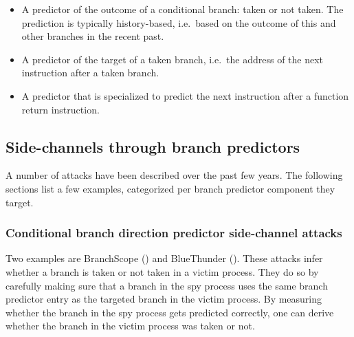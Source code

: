 \documentclass[
  a4paper,
]{report}
\providecommand{\tightlist}{%
  \setlength{\itemsep}{0pt}\setlength{\parskip}{0pt}}
\begin{document}
\begin{itemize}
\tightlist
\item
  A predictor of the outcome of a
  \label{__index_entry_143}{conditional
  branch}:
  \label{__index_entry_144}{taken} or
  not taken. The prediction is typically
  \label{__index_entry_145}{history-based},
  i.e.~based on the outcome of this and other branches in the recent
  past.
\item
  A predictor of the \label{__index_entry_146}{target of
  a taken branch}, i.e.~the address of
  the next instruction after a taken branch.
\item
  A predictor that is specialized to
  \label{__index_entry_147}{predict the next instruction
  after a function return instruction}.
\end{itemize}

\subsection{Side-channels through branch
predictors}\label{side-channels-through-branch-predictors}

A number of attacks have been described over the past few years. The
following sections list a few examples, categorized per branch predictor
component they target.

\subsubsection{Conditional branch direction predictor side-channel
attacks}\label{conditional-branch-direction-predictor-side-channel-attacks}

\label{__index_entry_148}{}

Two examples are
\label{__index_entry_149}{BranchScope}
() and
\label{__index_entry_150}{BlueThunder}
(). These attacks infer whether a
branch is taken or not taken in a victim process. They do so by
carefully making sure that a branch in the spy process uses the same
branch predictor entry as the targeted branch in the victim process. By
measuring whether the branch in the spy process gets predicted
correctly, one can derive whether the branch in the victim process was
taken or not.
\end{document}
